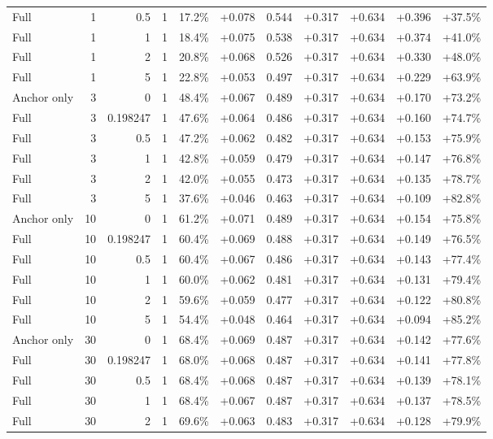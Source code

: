 \begin{table}[htbp]
\begin{tabular}{lrrrccccccc}
Full & 1 & 0.5 & 1 & 17.2\% & +0.078 & 0.544 & +0.317 & +0.634 & +0.396 & +37.5\% \\
Full & 1 & 1 & 1 & 18.4\% & +0.075 & 0.538 & +0.317 & +0.634 & +0.374 & +41.0\% \\
Full & 1 & 2 & 1 & 20.8\% & +0.068 & 0.526 & +0.317 & +0.634 & +0.330 & +48.0\% \\
Full & 1 & 5 & 1 & 22.8\% & +0.053 & 0.497 & +0.317 & +0.634 & +0.229 & +63.9\% \\
Anchor only & 3 & 0 & 1 & 48.4\% & +0.067 & 0.489 & +0.317 & +0.634 & +0.170 & +73.2\% \\
Full & 3 & 0.198247 & 1 & 47.6\% & +0.064 & 0.486 & +0.317 & +0.634 & +0.160 & +74.7\% \\
Full & 3 & 0.5 & 1 & 47.2\% & +0.062 & 0.482 & +0.317 & +0.634 & +0.153 & +75.9\% \\
Full & 3 & 1 & 1 & 42.8\% & +0.059 & 0.479 & +0.317 & +0.634 & +0.147 & +76.8\% \\
Full & 3 & 2 & 1 & 42.0\% & +0.055 & 0.473 & +0.317 & +0.634 & +0.135 & +78.7\% \\
Full & 3 & 5 & 1 & 37.6\% & +0.046 & 0.463 & +0.317 & +0.634 & +0.109 & +82.8\% \\
Anchor only & 10 & 0 & 1 & 61.2\% & +0.071 & 0.489 & +0.317 & +0.634 & +0.154 & +75.8\% \\
Full & 10 & 0.198247 & 1 & 60.4\% & +0.069 & 0.488 & +0.317 & +0.634 & +0.149 & +76.5\% \\
Full & 10 & 0.5 & 1 & 60.4\% & +0.067 & 0.486 & +0.317 & +0.634 & +0.143 & +77.4\% \\
Full & 10 & 1 & 1 & 60.0\% & +0.062 & 0.481 & +0.317 & +0.634 & +0.131 & +79.4\% \\
Full & 10 & 2 & 1 & 59.6\% & +0.059 & 0.477 & +0.317 & +0.634 & +0.122 & +80.8\% \\
Full & 10 & 5 & 1 & 54.4\% & +0.048 & 0.464 & +0.317 & +0.634 & +0.094 & +85.2\% \\
Anchor only & 30 & 0 & 1 & 68.4\% & +0.069 & 0.487 & +0.317 & +0.634 & +0.142 & +77.6\% \\
Full & 30 & 0.198247 & 1 & 68.0\% & +0.068 & 0.487 & +0.317 & +0.634 & +0.141 & +77.8\% \\
Full & 30 & 0.5 & 1 & 68.4\% & +0.068 & 0.487 & +0.317 & +0.634 & +0.139 & +78.1\% \\
Full & 30 & 1 & 1 & 68.4\% & +0.067 & 0.487 & +0.317 & +0.634 & +0.137 & +78.5\% \\
Full & 30 & 2 & 1 & 69.6\% & +0.063 & 0.483 & +0.317 & +0.634 & +0.128 & +79.9\% \\

\end{tabular}
\end{table}
